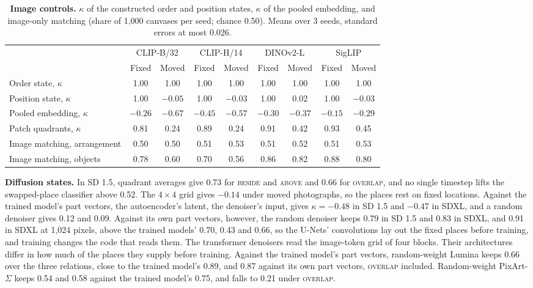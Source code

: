 \begin{table}[t]
  \caption{\textbf{Image controls.} $\kappa$ of the constructed order and position states, $\kappa$ of the pooled embedding, and image-only matching (share of 1{,}000 canvases per seed; chance 0.50). Means over 3 seeds, standard errors at most 0.026.}
  \label{tab:imgctrl}
  \centering\footnotesize
  \begin{tabular}{@{}lcccccccc@{}}
    \toprule
     & \multicolumn{2}{c}{CLIP-B/32} & \multicolumn{2}{c}{CLIP-H/14} & \multicolumn{2}{c}{DINOv2-L} & \multicolumn{2}{c}{SigLIP} \\
     & Fixed & Moved & Fixed & Moved & Fixed & Moved & Fixed & Moved \\
    \midrule
    Order state, $\kappa$ & 1.00 & 1.00 & 1.00 & 1.00 & 1.00 & 1.00 & 1.00 & 1.00 \\
    Position state, $\kappa$ & 1.00 & $-0.05$ & 1.00 & $-0.03$ & 1.00 & 0.02 & 1.00 & $-0.03$ \\
    Pooled embedding, $\kappa$ & $-0.26$ & $-0.67$ & $-0.45$ & $-0.57$ & $-0.30$ & $-0.37$ & $-0.15$ & $-0.29$ \\
    Patch quadrants, $\kappa$ & 0.81 & 0.24 & 0.89 & 0.24 & 0.91 & 0.42 & 0.93 & 0.45 \\
    Image matching, arrangement & 0.50 & 0.50 & 0.51 & 0.53 & 0.51 & 0.52 & 0.51 & 0.53 \\
    Image matching, objects & 0.78 & 0.60 & 0.70 & 0.56 & 0.86 & 0.82 & 0.88 & 0.80 \\
    \bottomrule
  \end{tabular}
\end{table}

\textbf{Diffusion states.} In SD 1.5, quadrant averages give 0.73 for \textsc{beside} and \textsc{above} and 0.66 for \textsc{overlap}, and no single timestep lifts the swapped-place classifier above 0.52. The $4 \times 4$ grid gives $-0.14$ under moved photographs, so the places rest on fixed locations. Against the trained model's part vectors, the autoencoder's latent, the denoiser's input, gives $\kappa = -0.48$ in SD 1.5 and $-0.47$ in SDXL, and a random denoiser gives 0.12 and 0.09. Against its own part vectors, however, the random denoiser keeps 0.79 in SD 1.5 and 0.83 in SDXL, and 0.91 in SDXL at 1{,}024 pixels, above the trained models' 0.70, 0.43 and 0.66, so the U-Nets' convolutions lay out the fixed places before training, and training changes the code that reads them. The transformer denoisers read the image-token grid of four blocks. Their architectures differ in how much of the places they supply before training. Against the trained model's part vectors, random-weight Lumina keeps 0.66 over the three relations, close to the trained model's 0.89, and 0.87 against its own part vectors, \textsc{overlap} included. Random-weight PixArt-$\Sigma$ keeps 0.54 and 0.58 against the trained model's 0.75, and falls to 0.21 under \textsc{overlap}.

